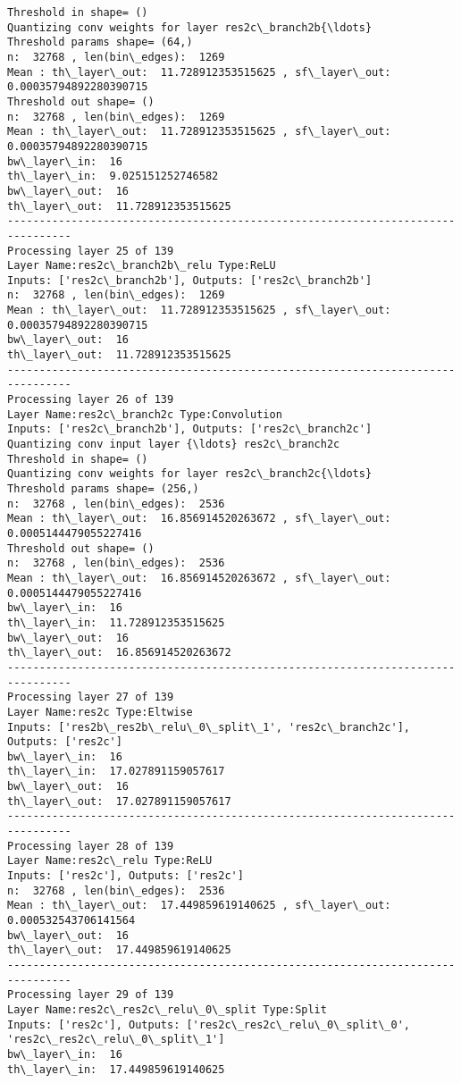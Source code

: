 \documentclass[11pt]{article}
\begin{document}
\begin{Verbatim}[commandchars=\\\{\}]
Threshold in shape= ()
Quantizing conv weights for layer res2c\_branch2b{\ldots}
Threshold params shape= (64,)
n:  32768 , len(bin\_edges):  1269
Mean : th\_layer\_out:  11.728912353515625 , sf\_layer\_out:  0.00035794892280390715
Threshold out shape= ()
n:  32768 , len(bin\_edges):  1269
Mean : th\_layer\_out:  11.728912353515625 , sf\_layer\_out:  0.00035794892280390715
bw\_layer\_in:  16
th\_layer\_in:  9.025151252746582
bw\_layer\_out:  16
th\_layer\_out:  11.728912353515625
--------------------------------------------------------------------------------
Processing layer 25 of 139
Layer Name:res2c\_branch2b\_relu Type:ReLU
Inputs: ['res2c\_branch2b'], Outputs: ['res2c\_branch2b']
n:  32768 , len(bin\_edges):  1269
Mean : th\_layer\_out:  11.728912353515625 , sf\_layer\_out:  0.00035794892280390715
bw\_layer\_out:  16
th\_layer\_out:  11.728912353515625
--------------------------------------------------------------------------------
Processing layer 26 of 139
Layer Name:res2c\_branch2c Type:Convolution
Inputs: ['res2c\_branch2b'], Outputs: ['res2c\_branch2c']
Quantizing conv input layer {\ldots} res2c\_branch2c
Threshold in shape= ()
Quantizing conv weights for layer res2c\_branch2c{\ldots}
Threshold params shape= (256,)
n:  32768 , len(bin\_edges):  2536
Mean : th\_layer\_out:  16.856914520263672 , sf\_layer\_out:  0.0005144479055227416
Threshold out shape= ()
n:  32768 , len(bin\_edges):  2536
Mean : th\_layer\_out:  16.856914520263672 , sf\_layer\_out:  0.0005144479055227416
bw\_layer\_in:  16
th\_layer\_in:  11.728912353515625
bw\_layer\_out:  16
th\_layer\_out:  16.856914520263672
--------------------------------------------------------------------------------
Processing layer 27 of 139
Layer Name:res2c Type:Eltwise
Inputs: ['res2b\_res2b\_relu\_0\_split\_1', 'res2c\_branch2c'], Outputs: ['res2c']
bw\_layer\_in:  16
th\_layer\_in:  17.027891159057617
bw\_layer\_out:  16
th\_layer\_out:  17.027891159057617
--------------------------------------------------------------------------------
Processing layer 28 of 139
Layer Name:res2c\_relu Type:ReLU
Inputs: ['res2c'], Outputs: ['res2c']
n:  32768 , len(bin\_edges):  2536
Mean : th\_layer\_out:  17.449859619140625 , sf\_layer\_out:  0.000532543706141564
bw\_layer\_out:  16
th\_layer\_out:  17.449859619140625
--------------------------------------------------------------------------------
Processing layer 29 of 139
Layer Name:res2c\_res2c\_relu\_0\_split Type:Split
Inputs: ['res2c'], Outputs: ['res2c\_res2c\_relu\_0\_split\_0', 'res2c\_res2c\_relu\_0\_split\_1']
bw\_layer\_in:  16
th\_layer\_in:  17.449859619140625

\end{Verbatim}
\end{document}

